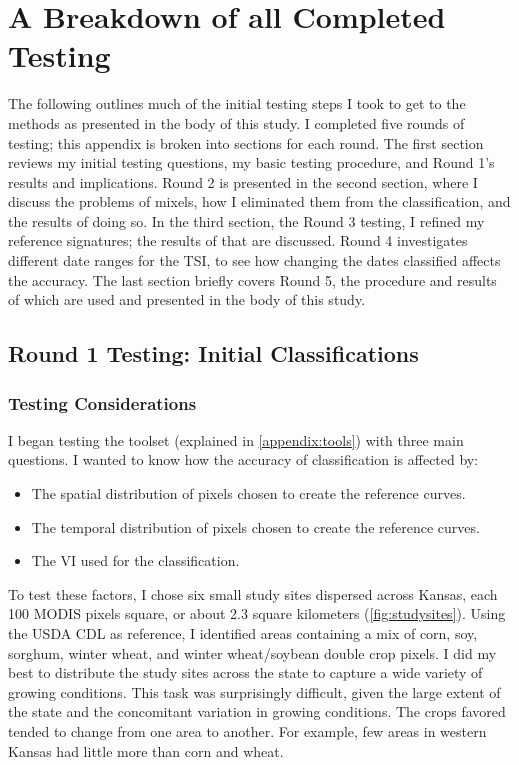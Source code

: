 \chapter{A Breakdown of all Completed Testing}
\label{appendix:testing}

The following outlines much of the initial testing steps I took to get to the methods as presented in the body of this study. I completed five rounds of testing; this appendix is broken into sections for each round. The first section reviews my initial testing questions, my basic testing procedure, and Round 1's results and implications. Round 2 is presented in the second section, where I discuss the problems of mixels, how I eliminated them from the classification, and the results of doing so. In the third section, the Round 3 testing, I refined my reference signatures; the results of that are discussed. Round 4 investigates different date ranges for the TSI, to see how changing the dates classified affects the accuracy. The last section briefly covers Round 5, the procedure and results of which are used and presented in the body of this study.

\section{Round 1 Testing: Initial Classifications}
\label{appendix:testing:r1}
\subsection*{Testing Considerations}

I began testing the toolset (explained in \autoref{appendix:tools}) with three main questions. I wanted to know how the accuracy of classification is affected by:

\begin{Spacing}{1.2}
\begin{itemize}
  \item The spatial distribution of pixels chosen to create the reference curves.
  \item The temporal distribution of pixels chosen to create the reference curves.
  \item The VI used for the classification.
\end{itemize}
\end{Spacing}

To test these factors, I chose six small study sites dispersed across Kansas, each 100 MODIS pixels square, or about 2.3 square kilometers (\autoref{fig:studysites}). Using the USDA CDL as reference, I identified areas containing a mix of corn, soy, sorghum, winter wheat,  and winter wheat/soybean double crop pixels. I did my best to distribute the study sites across the state to capture a wide variety of growing conditions. This task was surprisingly difficult, given the large extent of the state and the concomitant variation in growing conditions. The crops favored tended to change from one area to another. For example, few areas in western Kansas had little more than corn and wheat.

